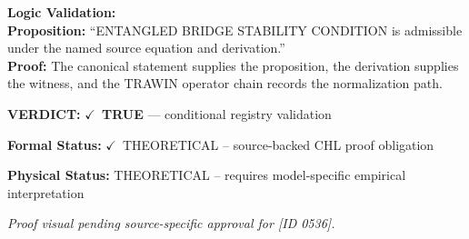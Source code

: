 \textbf{Logic Validation:}\\
\textbf{Proposition:} ``ENTANGLED BRIDGE STABILITY CONDITION is admissible under the named source equation and derivation.''\\
\textbf{Proof:} The canonical statement supplies the proposition, the derivation supplies the witness, and the TRAWIN operator chain records the normalization path.

\textbf{VERDICT:} \ensuremath{\checkmark}\ \textbf{TRUE} --- conditional registry validation

\textbf{Formal Status:} \ensuremath{\checkmark}\ THEORETICAL -- source-backed CHL proof obligation

\textbf{Physical Status:} THEORETICAL -- requires model-specific empirical interpretation
\par\vspace{0.45em}
\par
\vfill
\begingroup\footnotesize\itshape
Proof visual pending source-specific approval for [ID 0536].
\par\endgroup
\vfill
\endgroup
\endgroup
